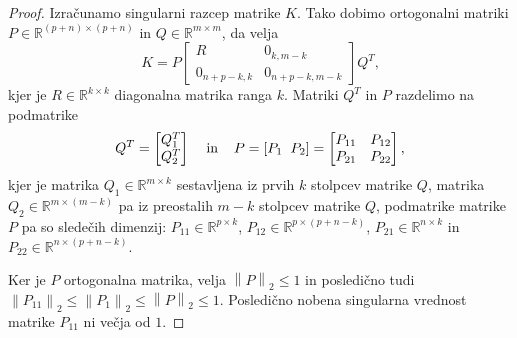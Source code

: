 \documentclass[mat1]{article}
\newcommand{\norm}[1]{\left\lVert#1\right\rVert}
\begin{document}
\begin{proof}
Izračunamo singularni razcep matrike  $K$. Tako dobimo ortogonalni matriki $P \in \mathbb{R}^{(p+n) \times (p+n)}$ in $Q \in \mathbb{R}^{m \times m}$, da velja 
\begin{equation}K = 
P
\begin{bmatrix} 
R & 0_{k, m-k} \\
0_{n+p-k, k} & 0_{n+p-k, m-k} 
\end{bmatrix} \label{eq:5}
Q^T
\text{,}
\end{equation}
kjer je $R \in \mathbb{R}^{k \times k}$ diagonalna matrika ranga $k$. Matriki $Q^T$ in $P$ razdelimo na podmatrike
$$  Q^T = 
\begin{bmatrix}
Q_1^T\\
Q_2^T
\end{bmatrix}
\hspace{4mm} \text{in} \hspace{4mm}
P = \left[P_1 \hspace{2mm} P_2 \right]
=
\begin{bmatrix} 
P_{11} & P_{12} \\
P_{21} & P_{22} 
\end{bmatrix},
$$
kjer je matrika $Q_1 \in \mathbb{R}^{m \times k}$ sestavljena iz prvih $k$ stolpcev matrike $Q$, matrika $Q_2 \in \mathbb{R}^{m \times (m-k)}$ pa iz preostalih $m-k$ stolpcev matrike $Q$, podmatrike matrike $P$ pa so sledečih dimenzij: $P_{11} \in \mathbb{R}^{p \times k}$, $P_{12} \in \mathbb{R}^{p \times (p+n-k)}$, $P_{21} \in \mathbb{R}^{n \times k}$ in $P_{22} \in \mathbb{R}^{n \times (p+n-k)}$.

Ker je $P$ ortogonalna matrika, velja $\norm{P}_2 \leq 1$ in posledično tudi $\norm{P_{11}}_2 \leq \norm{P_{1}}_2 \leq \norm{P}_2 \leq 1$. Posledično nobena singularna vrednost matrike $P_{11}$ ni večja od $1$. %


\end{proof}
\end{document}
